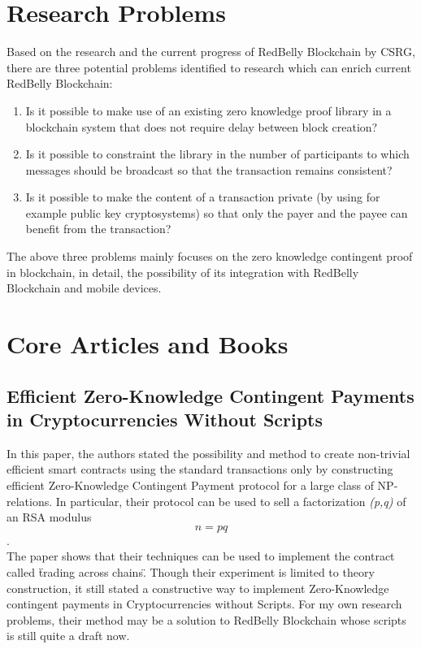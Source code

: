 \section{Research Problems}
\label{sec:research problems}

Based on the research and the current progress of RedBelly Blockchain by CSRG, there are three potential problems identified to research which can enrich current RedBelly Blockchain:

\begin{enumerate}
\item Is it possible to make use of an existing zero knowledge proof library in a blockchain system that does not require delay between block creation?
\item Is it possible to constraint the library in the number of participants to which messages should be broadcast so that the transaction remains consistent?
\item Is it possible to make the content of a transaction private (by using for example public key cryptosystems) so that only the payer and the payee can benefit from the transaction?
\end{enumerate}
The above three problems mainly focuses on the zero knowledge contingent proof in blockchain, in detail, the possibility of its integration with RedBelly Blockchain and mobile devices.

\section{Core Articles and Books}
\label{sec:core articles and books}

\subsection{Efficient Zero-Knowledge Contingent Payments in Cryptocurrencies Without Scripts\cite{Banasik2016}}

In this paper, the authors stated the possibility and method to create non-trivial efficient 
smart contracts using the standard transactions only by constructing efficient Zero-Knowledge 
Contingent Payment protocol for a large class of NP-relations. In particular, their protocol 
can be used to sell a factorization \textit{(p,q)} of an RSA modulus $$n=pq$$.\\ The paper 
shows that their techniques can be used to implement the contract called \"trading across 
chains\". Though their experiment is limited to theory construction, it still stated a 
constructive way to implement Zero-Knowledge contingent payments in Cryptocurrencies without 
Scripts. For my own research problems, their method may be a solution to RedBelly Blockchain 
whose scripts is still quite a draft now.

